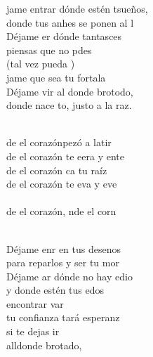 \documentclass[12pt]{article}
\begin{document}
\begin{multicols*}{2}
\begin{cancion}%
	jame entrar dónde estén tsueños,\\
	donde tus anhes se ponen al l  \\
	Déjame er dónde tantasces  \\
	piensas que no pdes \\
	(tal vez pueda )\\
	jame que sea tu fortala  \\
	Déjame vir al donde brotodo, \\
	donde nace to, justo a la raz. \\\jump\\
	\begin{chorus}%
	de el corazónpezó a latir  \\
	de el corazón te eera y ente  \\
	de el corazón ca tu raíz  \\
	de el corazón te eva y eve  \\
{}\vspace*{-0.4cm}\\
	de el corazón, nde el corn  \\
	\end{chorus}%
	\jump\\
	Déjame enr en tus desenos  \\
	para reparlos y ser tu mor  \\
	Déjame ar dónde no hay edio \\
	y donde estén tus edos \\
	encontrar var \\
	tu confianza tará esperanz\\
si te dejas ir \\
	alldonde brotado,\\

\end{cancion}
\end{multicols*}
\end{document}
